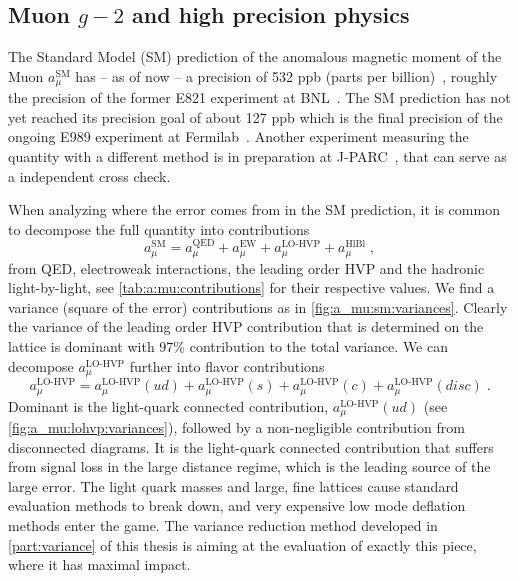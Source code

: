\subsection{Muon $g-2$ and high precision physics}

The Standard Model (SM) prediction of the anomalous magnetic moment of the Muon $a_{\mu}^{\text{SM}}$ has -- as of now -- a precision of \num{532} ppb (parts per billion)~\cite{snowmass:2025}, roughly the precision of the former E821 experiment at BNL~\cite{PhysRevD.73.072003}.
The SM prediction has not yet reached its precision goal of about \num{127} ppb which is the final precision of the ongoing E989 experiment at Fermilab~\cite{Muong-2:2025xyk}.
Another experiment measuring the quantity with a different method is in preparation at J-PARC~\cite{10.1093/ptep/ptz030}, that can serve as a independent cross check.

When analyzing where the error comes from in the SM prediction, it is common to decompose the full quantity into contributions
\begin{equation}
a_{\mu}^{\text{SM}} = a_{\mu}^{\text{QED}} + a_{\mu}^{\text{EW}} + a_{\mu}^{\text{LO-HVP}} + a_{\mu}^{\text{HlBl}} \;,
\end{equation}
from QED, electroweak interactions, the leading order HVP and the hadronic light-by-light, see \cref{tab:a:mu:contributions} for their respective values.
We find a variance (square of the error) contributions as in \cref{fig:a_mu:sm:variances}.
Clearly the variance of the leading order HVP contribution that is determined on the lattice is dominant with 97\% contribution to the total variance.
We can decompose $a_{\mu}^{\text{LO-HVP}}$ further into flavor contributions
\begin{equation}
a_{\mu}^{\text{LO-HVP}} = a_{\mu}^{\text{LO-HVP}}(ud) + a_{\mu}^{\text{LO-HVP}}(s) + a_{\mu}^{\text{LO-HVP}}(c) + a_{\mu}^{\text{LO-HVP}}(disc) \;.
\end{equation}
Dominant is the light-quark connected contribution, $a_{\mu}^{\text{LO-HVP}}(ud)$ (see \cref{fig:a_mu:lohvp:variances}), followed by a non-negligible contribution from disconnected diagrams.
It is the light-quark connected contribution that suffers from signal loss in the large distance regime, which is the leading source of the large error.
The light quark masses and large, fine lattices cause standard evaluation methods to break down, and very expensive low mode deflation methods enter the game.
The variance reduction method developed in \cref{part:variance} of this thesis is aiming at the evaluation of exactly this piece, where it has maximal impact.


